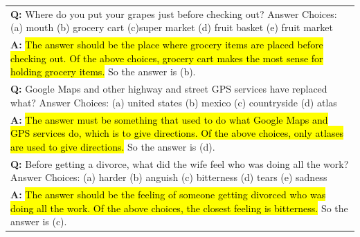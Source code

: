 \documentclass[]{article}
\theoremstyle{plain}
\theoremstyle{definition}
\theoremstyle{remark}
\begin{document}
\begin{table}[H]
\begin{tabular}{p{\linewidth}}
        \vspace{0mm}
        \textbf{Q:} Where do you put your grapes just before checking out? Answer Choices: (a) mouth (b) grocery cart (c)super market (d) fruit basket (e) fruit market\\
        \vspace{-1mm}
        \textbf{A:} \hl{The answer should be the place where grocery items are placed before checking out. Of the above choices, grocery cart makes the most sense for holding grocery items.} So the answer is (b). \\
        \vspace{0mm}
        \textbf{Q:} Google Maps and other highway and street GPS services have replaced what? Answer Choices: (a) united states (b) mexico (c) countryside (d) atlas \\
        \vspace{-1mm}
        \textbf{A:} \hl{The answer must be something that used to do what Google Maps and GPS services do, which is to give directions. Of the above choices, only atlases are used to give directions.} So the answer is (d). \\
        \vspace{0mm}
        \textbf{Q:} Before getting a divorce, what did the wife feel who was doing all the work? Answer Choices: (a) harder (b) anguish (c) bitterness (d) tears (e) sadness \\
        \vspace{-1mm}
        \textbf{A:} \hl{The answer should be the feeling of someone getting divorced who was doing all the work. Of the above choices, the closest feeling is bitterness.} So the answer is (c). \\
        \bottomrule
    \end{tabular}
    \label{tab:appendix-commonsenseqa-prompt}
\end{table}
\endgroup
\begingroup
\end{document}
